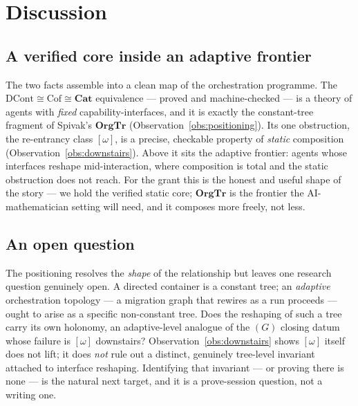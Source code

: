 \documentclass[11pt]{amsart}
\theoremstyle{definition}
\theoremstyle{remark}
\newcommand{\Cat}{\mathbf{Cat}}
\newcommand{\OrgTr}{\mathbf{OrgTr}}
\begin{document}
\section{Discussion}\label{sec:discussion}

\subsection*{A verified core inside an adaptive frontier}
The two facts assemble into a clean map of the orchestration programme. The
$\text{DCont}\cong\text{Cof}\cong\Cat$ equivalence --- proved and machine-checked
\cite{AhmanUustalu, leanreentrancy} --- is a theory of agents with \emph{fixed}
capability-interfaces, and it is exactly the constant-tree fragment of Spivak's $\OrgTr$
(Observation~\ref{obs:positioning}). Its one obstruction, the re-entrancy class $[\omega]$,
is a precise, checkable property of \emph{static} composition
(Observation~\ref{obs:downstairs}). Above it sits the adaptive frontier: agents whose
interfaces reshape mid-interaction, where composition is total and the static obstruction
does not reach. For the grant this is the honest and useful shape of the story --- we hold
the verified static core; $\OrgTr$ is the frontier the AI-mathematician setting will need,
and it composes more freely, not less.

\subsection*{An open question}
The positioning resolves the \emph{shape} of the relationship but leaves one research
question genuinely open. A directed container is a constant tree; an \emph{adaptive}
orchestration topology --- a migration graph that rewires as a run proceeds --- ought to
arise as a specific non-constant tree. Does the reshaping of such a tree carry its own
holonomy, an adaptive-level analogue of the $(G)$ closing datum whose failure is $[\omega]$
downstairs? Observation~\ref{obs:downstairs} shows $[\omega]$ itself does not lift; it does
\emph{not} rule out a distinct, genuinely tree-level invariant attached to interface
reshaping. Identifying that invariant --- or proving there is none --- is the natural next
target, and it is a prove-session question, not a writing one.
\end{document}
